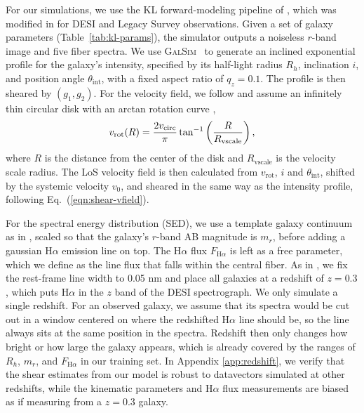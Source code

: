 For our simulations, we use the KL forward-modeling pipeline of \citep{KLInferenceI}, which was modified in \citep{KLDESI} for DESI and Legacy Survey observations. Given a set of galaxy parameters (Table~\ref{tab:kl-params}), the simulator outputs a noiseless $r$-band image and five fiber spectra. We use \textsc{GalSim}~\citep{galsim} to generate an inclined exponential profile for the galaxy's intensity, specified by its half-light radius $R_h$, inclination $i$, and position angle $\theta_\mathrm{int}$, with a fixed aspect ratio of $q_z=0.1$. The profile is then sheared by $(g_1, g_2)$. For the velocity field, we follow \citep{KLDESI} and assume an infinitely thin circular disk with an arctan rotation curve \citep{Courteau97},
\begin{equation}
\label{eqn:vrot}
    v_\mathrm{rot}(R) = \frac{2v_\mathrm{circ}}{\pi}\tan^{-1}\left(\frac{R}{R_\mathrm{vscale}}\right),
\end{equation}
where $R$ is the distance from the center of the disk and $R_\mathrm{vscale}$ is the velocity scale radius. The LoS velocity field is then calculated from $v_\mathrm{rot}$, $i$ and $\theta_\mathrm{int}$, shifted by the systemic velocity $v_0$, and sheared in the same way as the intensity profile, following Eq.~(\ref{eqn:shear-vfield}).

For the spectral energy distribution (SED), we use a template galaxy continuum as in \citep{KLDESI}, scaled so that the galaxy's $r$-band AB magnitude is $m_r$, before adding a gaussian H$\alpha$ emission line on top. The H$\alpha$ flux $F_{\mathrm{H}\alpha}$ is left as a free parameter, which we define as the line flux that falls within the central fiber. As in \citep{KLDESI}, we fix the rest-frame line width to 0.05 nm and place all galaxies at a redshift of $z=0.3$, which puts H$\alpha$ in the $z$ band of the DESI spectrograph. We only simulate a single redshift. For an observed galaxy, we assume that its spectra would be cut out in a window centered on where the redshifted H$\alpha$ line should be, so the line always sits at the same position in the spectra. Redshift then only changes how bright or how large the galaxy appears, which is already covered by the ranges of $R_h$, $m_r$, and $F_{\mathrm{H}\alpha}$ in our training set. In Appendix \ref{app:redshift}, we verify that the shear estimates from our model is robust to datavectors simulated at other redshifts, while the kinematic parameters and H$\alpha$ flux measurements are biased as if measuring from a $z=0.3$ galaxy. 

